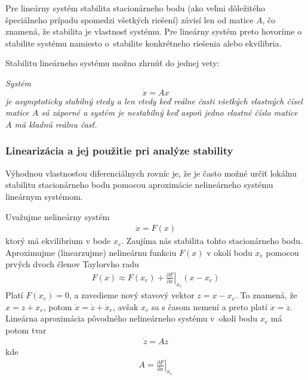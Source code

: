 \documentclass[a4paper, 10pt, ]{article}
\begin{document}
Pre lineárny systém stabilita stacionárneho bodu (ako veľmi dôležitého špeciálneho prípadu spomedzi všetkých riešení) závisí len od matice $A$, čo znamená, že stabilita je vlastnosť systému. Pre lineárny systém preto hovoríme o stabilite systému namiesto o~stabilite konkrétneho riešenia alebo ekvilibria.

Stabilitu lineárneho systému možno zhrnúť do jednej vety:

{ \it
\noindent
Systém
\begin{equation*}
	\dot{x} = A x
\end{equation*}
je asymptoticky stabilný vtedy a len vtedy keď reálne časti všetkých vlastných čísel matice $A$ sú záporné a systém je nestabilný keď aspoň jedno vlastné číslo matice $A$ má kladnú reálnu časť.
}





















\subsubsection{Linearizácia a jej použitie pri analýze stability}
\label{Linajejpouz}


Výhodnou vlastnosťou diferenciálnych rovníc je, že je často možné určiť lokálnu stabilitu stacionárneho bodu pomocou aproximácie nelineárneho systému lineárnym systémom.

Uvažujme nelineárny systém
\begin{align}
	\dot{x} = F(x)
\end{align}
ktorý má ekvilibrium v bode $x_e$. Zaujíma nás stabilita tohto stacionárneho bodu. Aproximujme (linearzujme) nelineárnu funkciu $F(x)$ v okolí bodu $x_e$ pomocou prvých dvoch členov Taylorvho radu
\begin{align}
	F(x) \approx F(x_e) + \left. \frac{\partial F}{\partial x} \right|_{x_e} (x - x_e)
\end{align}
Platí $F(x_e) = 0$, a zavedieme nový stavový vektor $z = x - x_e$. To znamená, že $x = z + x_e$, potom $\dot{x} = \dot{z} + \dot{x}_e$, avšak $x_e$ sa s časom nemení a preto platí  $\dot{x} = \dot{z}$. Lineárna aproximácia pôvodného nelineárneho systému v~okolí bodu $x_e$ má potom tvar
\begin{align}
	\dot{z} = Az
\end{align}
kde
\begin{align} \label{matApoLinearizacii}
	A = \left. \frac{\partial F}{\partial x} \right|_{x_e}
\end{align}
\end{document}
